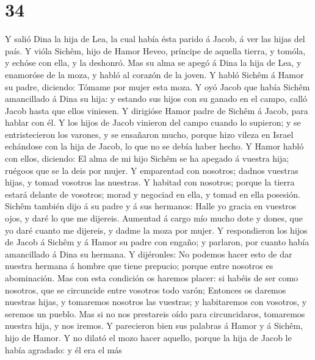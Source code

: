 \hypertarget{section-33}{%
\section{34}\label{section-33}}

 Y salió Dina la hija de Lea, la cual había ésta parido á
Jacob, á ver las hijas del país.  Y vióla Sichêm, hijo de
Hamor Heveo, príncipe de aquella tierra, y tomóla, y echóse con ella, y
la deshonró.  Mas su alma se apegó á Dina la hija de Lea,
y enamoróse de la moza, y habló al corazón de la joven.  Y
habló Sichêm á Hamor su padre, diciendo: Tómame por mujer esta moza.
 Y oyó Jacob que había Sichêm amancillado á Dina su hija:
y estando sus hijos con su ganado en el campo, calló Jacob hasta que
ellos viniesen.  Y dirigióse Hamor padre de Sichêm á
Jacob, para hablar con él.  Y los hijos de Jacob vinieron
del campo cuando lo supieron; y se entristecieron los varones, y se
ensañaron mucho, porque hizo vileza en Israel echándose con la hija de
Jacob, lo que no se debía haber hecho.  Y Hamor habló con
ellos, diciendo: El alma de mi hijo Sichêm se ha apegado á vuestra hija;
ruégoos que se la deis por mujer.  Y emparentad con
nosotros; dadnos vuestras hijas, y tomad vosotros las nuestras.
 Y habitad con nosotros; porque la tierra estará delante
de vosotros; morad y negociad en ella, y tomad en ella posesión.
 Sichêm también dijo á su padre y á sus hermanos: Halle
yo gracia en vuestros ojos, y daré lo que me dijereis. 
Aumentad á cargo mío mucho dote y dones, que yo daré cuanto me dijereis,
y dadme la moza por mujer.  Y respondieron los hijos de
Jacob á Sichêm y á Hamor su padre con engaño; y parlaron, por cuanto
había amancillado á Dina su hermana.  Y dijéronles: No
podemos hacer esto de dar nuestra hermana á hombre que tiene prepucio;
porque entre nosotros es abominación.  Mas con esta
condición os haremos placer: si habéis de ser como nosotros, que se
circuncide entre vosotros todo varón;  Entonces os
daremos nuestras hijas, y tomaremos nosotros las vuestras; y habitaremos
con vosotros, y seremos un pueblo.  Mas si no nos
prestareis oído para circuncidaros, tomaremos nuestra hija, y nos
iremos.  Y parecieron bien sus palabras á Hamor y á
Sichêm, hijo de Hamor.  Y no dilató el mozo hacer
aquello, porque la hija de Jacob le había agradado: y él era el más
